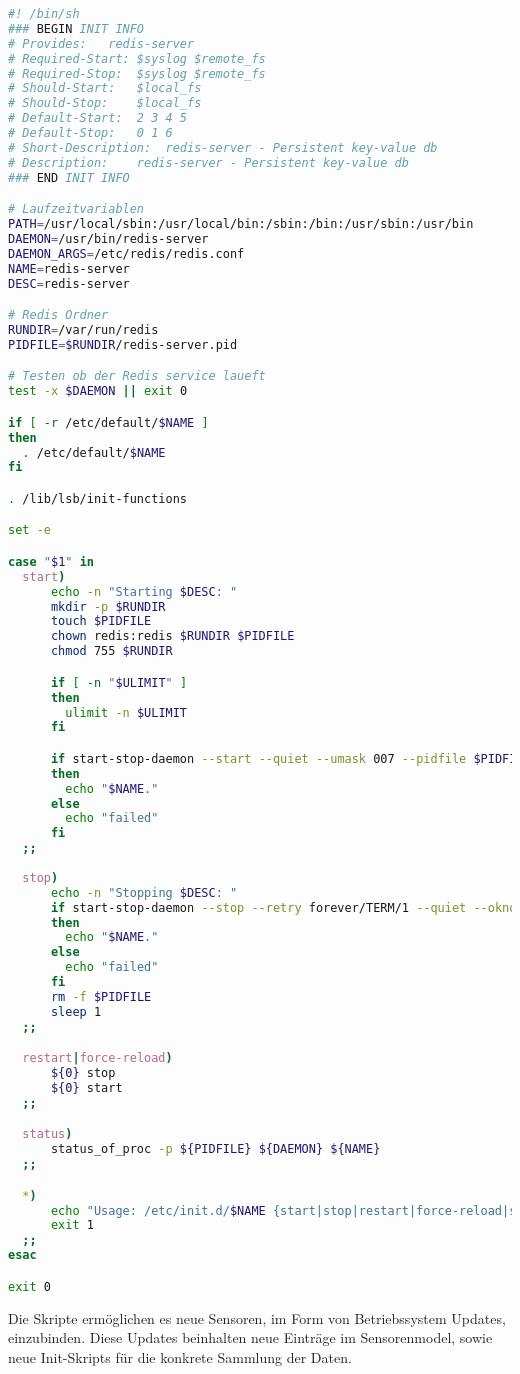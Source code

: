 \begin{lstlisting}[language=Bash, caption=Redis Server Service, label={lst:redisinit}]
#! /bin/sh
### BEGIN INIT INFO
# Provides:   redis-server
# Required-Start: $syslog $remote_fs
# Required-Stop:  $syslog $remote_fs
# Should-Start:   $local_fs
# Should-Stop:    $local_fs
# Default-Start:  2 3 4 5
# Default-Stop:   0 1 6
# Short-Description:  redis-server - Persistent key-value db
# Description:    redis-server - Persistent key-value db
### END INIT INFO

# Laufzeitvariablen
PATH=/usr/local/sbin:/usr/local/bin:/sbin:/bin:/usr/sbin:/usr/bin
DAEMON=/usr/bin/redis-server
DAEMON_ARGS=/etc/redis/redis.conf
NAME=redis-server
DESC=redis-server

# Redis Ordner
RUNDIR=/var/run/redis
PIDFILE=$RUNDIR/redis-server.pid

# Testen ob der Redis service laueft
test -x $DAEMON || exit 0

if [ -r /etc/default/$NAME ]
then
  . /etc/default/$NAME
fi

. /lib/lsb/init-functions

set -e

case "$1" in
  start)
      echo -n "Starting $DESC: "
      mkdir -p $RUNDIR
      touch $PIDFILE
      chown redis:redis $RUNDIR $PIDFILE
      chmod 755 $RUNDIR

      if [ -n "$ULIMIT" ]
      then
        ulimit -n $ULIMIT
      fi

      if start-stop-daemon --start --quiet --umask 007 --pidfile $PIDFILE --chuid redis:redis --exec $DAEMON -- $DAEMON_ARGS
      then
        echo "$NAME."
      else
        echo "failed"
      fi
  ;;
  
  stop)
      echo -n "Stopping $DESC: "
      if start-stop-daemon --stop --retry forever/TERM/1 --quiet --oknodo --pidfile $PIDFILE --exec $DAEMON
      then
        echo "$NAME."
      else
        echo "failed"
      fi
      rm -f $PIDFILE
      sleep 1
  ;;

  restart|force-reload)
      ${0} stop
      ${0} start
  ;;

  status)
      status_of_proc -p ${PIDFILE} ${DAEMON} ${NAME}
  ;;

  *)
      echo "Usage: /etc/init.d/$NAME {start|stop|restart|force-reload|status}" >&2
      exit 1
  ;;
esac

exit 0
\end{lstlisting}

Die Skripte ermöglichen es neue Sensoren, im Form von Betriebssystem Updates, einzubinden. Diese Updates beinhalten neue Einträge im Sensorenmodel, sowie neue Init-Skripts für die konkrete Sammlung der Daten.